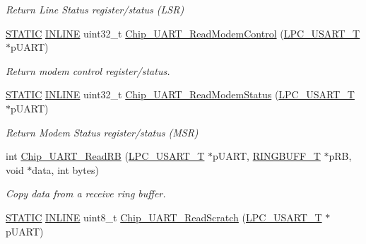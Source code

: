 \begin{DoxyCompactItemize}
\begin{DoxyCompactList}\small\item\em Return Line Status register/status (L\+SR) \end{DoxyCompactList}\item 
\hyperlink{group__LPC__Types__Public__Macros_ga10b2d890d871e1489bb02b7e70d9bdfb}{S\+T\+A\+T\+IC} \hyperlink{group__LPC__Types__Public__Types_ga2eb6f9e0395b47b8d5e3eeae4fe0c116}{I\+N\+L\+I\+NE} uint32\+\_\+t \hyperlink{group__UART__17XX__40XX_gadef0e0d2ea30182cd99561efe9909707}{Chip\+\_\+\+U\+A\+R\+T\+\_\+\+Read\+Modem\+Control} (\hyperlink{structLPC__USART__T}{L\+P\+C\+\_\+\+U\+S\+A\+R\+T\+\_\+T} $\ast$p\+U\+A\+RT)
\begin{DoxyCompactList}\small\item\em Return modem control register/status. \end{DoxyCompactList}\item 
\hyperlink{group__LPC__Types__Public__Macros_ga10b2d890d871e1489bb02b7e70d9bdfb}{S\+T\+A\+T\+IC} \hyperlink{group__LPC__Types__Public__Types_ga2eb6f9e0395b47b8d5e3eeae4fe0c116}{I\+N\+L\+I\+NE} uint32\+\_\+t \hyperlink{group__UART__17XX__40XX_gacd3d5239dec0378e52602633c183e942}{Chip\+\_\+\+U\+A\+R\+T\+\_\+\+Read\+Modem\+Status} (\hyperlink{structLPC__USART__T}{L\+P\+C\+\_\+\+U\+S\+A\+R\+T\+\_\+T} $\ast$p\+U\+A\+RT)
\begin{DoxyCompactList}\small\item\em Return Modem Status register/status (M\+SR) \end{DoxyCompactList}\item 
int \hyperlink{group__UART__17XX__40XX_gab54219751466a0fa8d9e75f8689ac99d}{Chip\+\_\+\+U\+A\+R\+T\+\_\+\+Read\+RB} (\hyperlink{structLPC__USART__T}{L\+P\+C\+\_\+\+U\+S\+A\+R\+T\+\_\+T} $\ast$p\+U\+A\+RT, \hyperlink{structRINGBUFF__T}{R\+I\+N\+G\+B\+U\+F\+F\+\_\+T} $\ast$p\+RB, void $\ast$data, int bytes)
\begin{DoxyCompactList}\small\item\em Copy data from a receive ring buffer. \end{DoxyCompactList}\item 
\hyperlink{group__LPC__Types__Public__Macros_ga10b2d890d871e1489bb02b7e70d9bdfb}{S\+T\+A\+T\+IC} \hyperlink{group__LPC__Types__Public__Types_ga2eb6f9e0395b47b8d5e3eeae4fe0c116}{I\+N\+L\+I\+NE} uint8\+\_\+t \hyperlink{group__UART__17XX__40XX_gafa7b67254c1f19bb0b085736049d9879}{Chip\+\_\+\+U\+A\+R\+T\+\_\+\+Read\+Scratch} (\hyperlink{structLPC__USART__T}{L\+P\+C\+\_\+\+U\+S\+A\+R\+T\+\_\+T} $\ast$p\+U\+A\+RT)

\end{DoxyCompactItemize}
